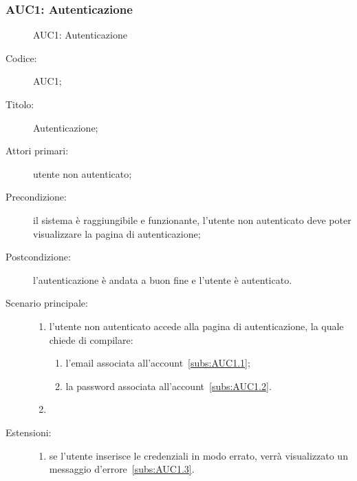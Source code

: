 \documentclass[../../../analisi-dei-requisiti.tex]{subfiles}
\begin{document}
\subsubsection{AUC1: Autenticazione}%
\label{subs:AUC1}

\begin{figure}[H]
  \centering
  \caption{AUC1: Autenticazione}%
  \label{fig:auc1}
\end{figure}

\begin{description}
  \item[Codice:] AUC1;
  \item[Titolo:] Autenticazione;
  \item[Attori primari:] utente non autenticato;
  \item[Precondizione:] il sistema è raggiungibile e funzionante, l'utente non autenticato deve poter visualizzare la pagina di autenticazione;
  \item[Postcondizione:] l'autenticazione è andata a buon fine e l'utente è autenticato.
  \item[Scenario principale:]
  \begin{enumerate}
    \item l'utente non autenticato accede alla pagina di autenticazione, la quale chiede di compilare:
    \begin{enumerate}
      \item l'email associata all'account~\ref{subs:AUC1.1};
      \item la password associata all'account~\ref{subs:AUC1.2}.
    \end{enumerate}
    \item
  \end{enumerate}
  \item[Estensioni:]
  \begin{enumerate}
    \item se l'utente inserisce le credenziali in modo errato, verrà visualizzato un messaggio d'errore~\ref{subs:AUC1.3}.
  \end{enumerate}
\end{description}
\end{document}
